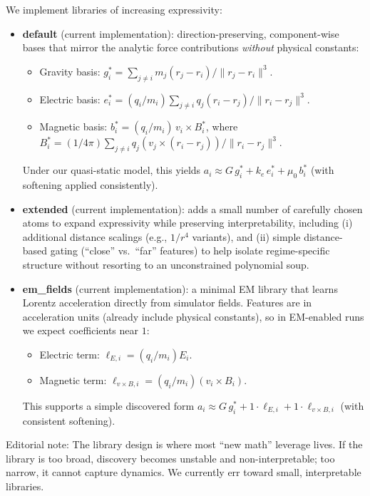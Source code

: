 \documentclass[11pt]{article}
\begin{document}
We implement libraries of increasing expressivity:
\begin{itemize}
\item \textbf{default} (current implementation): direction-preserving, component-wise bases that mirror the analytic force contributions \emph{without} physical constants:
\begin{itemize}
\item Gravity basis: $g_i^\ast = \sum_{j \ne i} m_j (r_j - r_i) / \|r_j-r_i\|^3$.
\item Electric basis: $e_i^\ast = (q_i/m_i)\sum_{j \ne i} q_j (r_i - r_j) / \|r_i-r_j\|^3$.
\item Magnetic basis: $b_i^\ast = (q_i/m_i)\, v_i \times B_i^\ast$, where $B_i^\ast = (1/4\pi)\sum_{j \ne i} q_j (v_j \times (r_i-r_j))/\|r_i-r_j\|^3$.
\end{itemize}
Under our quasi-static model, this yields $a_i \approx G\,g_i^\ast + k_e\,e_i^\ast + \mu_0\,b_i^\ast$ (with softening applied consistently).
\item \textbf{extended} (current implementation): adds a small number of carefully chosen atoms to expand expressivity while preserving interpretability, including (i) additional distance scalings (e.g., $1/r^4$ variants), and (ii) simple distance-based gating (``close'' vs.\ ``far'' features) to help isolate regime-specific structure without resorting to an unconstrained polynomial soup.
\item \textbf{em\_fields} (current implementation): a minimal EM library that learns Lorentz acceleration directly from simulator fields. Features are in acceleration units (already include physical constants), so in EM-enabled runs we expect coefficients near $1$:
\begin{itemize}
\item Electric term: $\ell_{E,i} = (q_i/m_i) E_i$.
\item Magnetic term: $\ell_{v\times B,i} = (q_i/m_i) (v_i \times B_i)$.
\end{itemize}
This supports a simple discovered form $a_i \approx G\,g_i^\ast + 1\cdot \ell_{E,i} + 1\cdot \ell_{v\times B,i}$ (with consistent softening).
\end{itemize}

Editorial note: The library design is where most ``new math'' leverage lives. If the library is too broad, discovery becomes unstable and non-interpretable; too narrow, it cannot capture dynamics. We currently err toward small, interpretable libraries.
\end{document}
